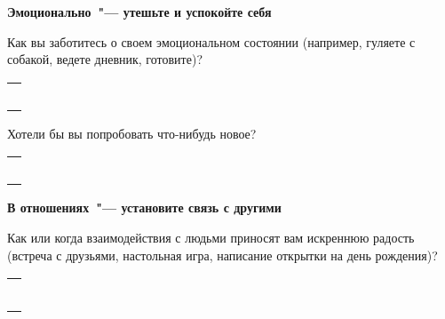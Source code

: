 \vspace{5ex}

{\large \textbf{Эмоционально~"--- утешьте и успокойте себя}}

\begin{itemize}
	\itemWritingHand Как вы заботитесь о своем эмоциональном состоянии (например, гуляете с собакой, ведете дневник, готовите)?
\end{itemize}

\setlength{\extrarowheight}{2mm}
\begin{tabularx}{\textwidth}{X}
	\\
	\arrayrulecolor{gray}\hline\\
	\hline\\
	\hline\\
	\hline\\
	\hline\\
	\hline\\
\end{tabularx}
\setlength{\extrarowheight}{0mm}

\begin{itemize}
	\itemWritingHand Хотели бы вы попробовать что-нибудь новое?
\end{itemize}

\setlength{\extrarowheight}{2mm}
\begin{tabularx}{\textwidth}{X}
	\\
	\arrayrulecolor{gray}\hline\\
	\hline\\
	\hline\\
	\hline\\
	\hline\\
	\hline\\
\end{tabularx}
\setlength{\extrarowheight}{0mm}

\vspace{5ex}

{\large \textbf{В отношениях~"--- установите связь с другими}}

\begin{itemize}
	\itemWritingHand Как или когда взаимодействия с людьми приносят вам искреннюю радость (встреча с друзьями, настольная игра, написание открытки на день рождения)?
\end{itemize}

\setlength{\extrarowheight}{2mm}
\begin{tabularx}{\textwidth}{X}
	\\
	\arrayrulecolor{gray}\hline\\
	\hline\\
	\hline\\
	\hline\\
	\hline\\
	\hline\\
	\hline\\
\end{tabularx}
\setlength{\extrarowheight}{0mm}

